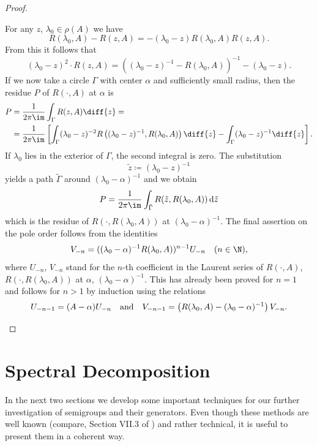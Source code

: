 \begin{proof}
\begin{enumerate}[\upshape (i), wide, labelindent=.25em]
For any $z$,  $\lambda_{0} \in \rho(A)$ we have 
%
\[
R(\lambda_{0},A) - R(z,A)= -(\lambda_{0}-z)R(\lambda_{0},A)R(z,A) .
\]
%
From this it follows that 
%
\[
	(\lambda_{0}-z)^2\cdot R(z,A) = \left((\lambda_{0}-z)^{-1}-R(\lambda_{0},A)\right)^{-1} - (\lambda_{0}-z) .
\]
%
If we now take a circle $\Gamma$ with center $\alpha$ and sufficiently small radius, then the residue $P$ of\/ $R(\cdot,A)$ at $\alpha$ is
\begin{align*}
P &=  \frac{1}{2\pi\im } \int_{\Gamma} R(z,A)   \diff{z} = \\
&=  \frac{1}{2\pi\im } \left[\int_{\Gamma} (\lambda_{0}-z)^{-2}R\left((\lambda_{0}-z)^{-1}, R(\lambda_{0},A)\right)  \diff{z}   - 
   \int_{\Gamma}(\lambda_{0}-z)^{-1} \diff{z} \right] . 
\end{align*} 
If\/ $\lambda_{0}$ lies in the exterior of\/ $\Gamma$, the second integral is zero.
The substitution 
%
\[
	 \tilde{z} \coloneq (\lambda_{0} - z)^{-1} 
\]
%
yields a path $\tilde{\Gamma}$ around $(\lambda_{0}-\alpha)^{-1}$ and we obtain
\[
P = \frac{1}{2\pi\im } \int_{\tilde{\Gamma}} R(\tilde{z},R(\lambda_{0},A)) \, \mathrm{d}\tilde{z}
\]
which is the residue of\/ $R(\cdot,R(\lambda_{0},A))$ at $(\lambda_{0}-\alpha)^{-1}$.
The final assertion on the pole order follows from the identities
\[
V_{-n} = ((\lambda_{0}-\alpha)^{-1}R(\lambda_{0},A))^{n-1}U_{-n} \quad (n \in \N) ,
\]
where $U_{- n}$, \resp $V_{- n}$ stand for the $ n $-th coefficient in the Laurent series of\/ $R(\cdot,A)$, \resp $R(\cdot,R(\lambda_{0},A))$ at $\alpha$, \resp $(\lambda_{0}-\alpha)^{-1}$.
This has already been proved for $n = 1$ and follows for $n > 1$ by induction using the relations
\begin{equation*}
U_{-n-1} = (A - \alpha)U_{-n} 
\quad \text{and} \quad 
V_{-n-1} = \left(R(\lambda_{0},A) - (\lambda_{0}-\alpha)^{-1}\right)V_{-n} .
\qedhere
\end{equation*}
\end{enumerate}
\end{proof}
\section{Spectral Decomposition}\label{sec:a3-3}%
In the next two sections we develop some important techniques for our further investigation of semigroups and their generators.
Even though these methods are well known (compare, \eg Section VII.3 of \textcite{dunfordschwartz:1958}) and rather technical, it is useful to present them in a coherent way.

